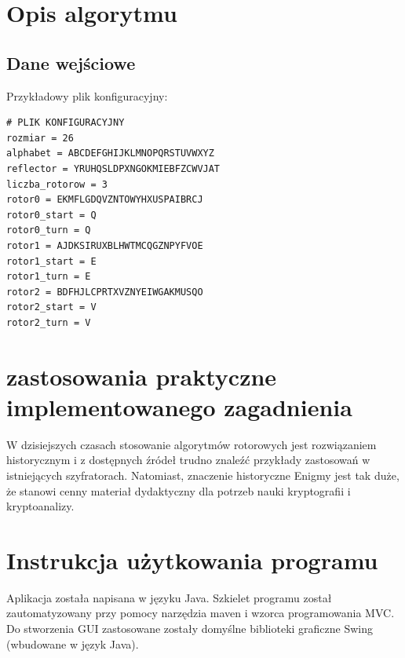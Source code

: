 \documentclass[11pt,a4paper,polish]{article}
\begin{document}
\newpage

\section{Opis algorytmu}
\subsection{Dane wejściowe}
Przykładowy plik konfiguracyjny:
\begin{verbatim}
# PLIK KONFIGURACYJNY
rozmiar = 26
alphabet = ABCDEFGHIJKLMNOPQRSTUVWXYZ
reflector = YRUHQSLDPXNGOKMIEBFZCWVJAT
liczba_rotorow = 3
rotor0 = EKMFLGDQVZNTOWYHXUSPAIBRCJ
rotor0_start = Q
rotor0_turn = Q
rotor1 = AJDKSIRUXBLHWTMCQGZNPYFVOE
rotor1_start = E
rotor1_turn = E
rotor2 = BDFHJLCPRTXVZNYEIWGAKMUSQO
rotor2_start = V
rotor2_turn = V

\end{verbatim}

\section{zastosowania praktyczne implementowanego zagadnienia}
W dzisiejszych czasach stosowanie algorytmów rotorowych jest rozwiązaniem
historycznym i z dostępnych źródeł trudno znaleźć przykłady zastosowań w
istniejących szyfratorach. Natomiast, znaczenie historyczne Enigmy jest tak
duże, że stanowi cenny materiał dydaktyczny dla potrzeb nauki kryptografii
i kryptoanalizy\cite{4640685,Hodges}.


\section{Instrukcja użytkowania programu}
Aplikacja została napisana w języku Java. Szkielet programu został
zautomatyzowany przy pomocy narzędzia maven i wzorca programowania MVC. Do
stworzenia GUI zastosowane zostały domyślne biblioteki graficzne Swing
(wbudowane w język Java).
\end{document}
